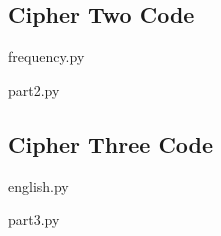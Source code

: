 \documentclass{article}
\begin{document}
\subsection{Cipher Two Code}

frequency.py



part2.py



\subsection{Cipher Three Code}

english.py



part3.py


\end{document}
